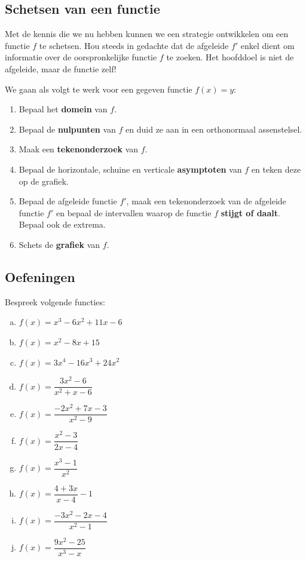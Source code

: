 \documentclass[a4paper,12pt,twoside]{article}
\begin{document}
\subsection{Schetsen van een functie}

Met de kennis die we nu hebben kunnen we een strategie ontwikkelen om een functie $f$ te schetsen. Hou steeds in gedachte dat de afgeleide $f'$ enkel dient om informatie over de oorspronkelijke functie $f$ te zoeken. Het hoofddoel is niet de afgeleide, maar de functie zelf!

We gaan als volgt te werk voor een gegeven functie $f(x)=y$:
\begin{enumerate}
\item Bepaal het {\bf domein} van $f$.
\item Bepaal de {\bf nulpunten} van $f$ en duid ze aan in een orthonormaal assenstelsel.
\item Maak een {\bf tekenonderzoek} van $f$.
\item Bepaal de horizontale, schuine en verticale {\bf asymptoten} van $f$ en teken deze op de grafiek.
\item Bepaal de afgeleide functie $f'$, maak een tekenonderzoek van de afgeleide functie $f'$ en bepaal de intervallen waarop de functie $f$ {\bf stijgt of daalt}. Bepaal ook de extrema.
\item Schets de {\bf grafiek} van $f$.
\end{enumerate}

\subsection{Oefeningen}

\begin{oefening}
  Bespreek volgende functies:
  \begin{multicols}{3}
  \begin{enumerate}[(a)]
  \itemsep1em
  \item $f(x)=x^3-6x^2+11x-6$
  \item $f(x)=x^2-8x+15$
  \item $f(x)=3x^4-16x^3+24x^2$
  \item $f(x)=\dfrac{3x^2-6}{x^2+x-6}$
  \item $f(x)=\dfrac{-2x^2+7x-3}{x^2-9}$
  \item $f(x)=\dfrac{x^2-3}{2x-4}$
  \item $f(x)=\dfrac{x^3-1}{x^2}$
  \item $f(x)=\dfrac{4+3x}{x-4}-1$
  \item $f(x)=\dfrac{-3x^2-2x-4}{x^2-1}$
  \item $f(x)=\dfrac{9x^2-25}{x^3-x}$
  \end{enumerate}
  \end{multicols}
\end{oefening}
\end{document}
